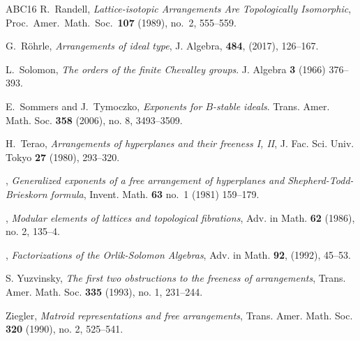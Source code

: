 \documentclass[12pt]{amsart}
\numberwithin{equation}{section}
\theoremstyle{plain}
\theoremstyle{definition}
\begin{document}
\begin{thebibliography}{ABC{\etalchar{+}}16}
R.~Randell,
\emph{Lattice-isotopic Arrangements Are Topologically Isomorphic},
Proc.\ Amer.\ Math.\ Soc.\ \textbf{107} (1989), no.~2, 555--559.

	G.~R\"ohrle,
	\emph{Arrangements of ideal type},
	J. Algebra, \textbf{484},  (2017), 126--167.

L.~Solomon, 
\emph{The orders of the finite Chevalley groups}.
J. Algebra \textbf{3} (1966) 376--393. 

E.~Sommers and J.~Tymoczko,
\emph{Exponents for $B$-stable ideals}.
Trans. Amer. Math. Soc. \textbf{358} (2006), no. 8, 3493--3509.

 H.~Terao, \emph{Arrangements of hyperplanes and
	their freeness I, II}, J. Fac. Sci.  Univ. Tokyo \textbf{27} (1980),
293--320.

\bysame,
\emph{Generalized exponents of a free arrangement of hyperplanes and
	Shepherd-Todd-Brieskorn formula}, Invent. Math. \textbf{63} no.\ 1 (1981) 159--179.

\bysame, 
\emph{Modular elements of lattices and topological fibrations},
Adv. in Math. \textbf{62} (1986), no. 2, 135--4.

\bysame,
\emph{Factorizations of the Orlik-Solomon Algebras},
Adv. in Math. \textbf{92}, (1992), 45--53.

S. Yuzvinsky,
\emph{The first two obstructions to the freeness of arrangements},
Trans. Amer. Math. Soc. \textbf{335} (1993), no. 1, 231--244.

Ziegler,
\emph{Matroid representations and free arrangements}, 
Trans. Amer. Math. Soc. \textbf{320} (1990), no. 2, 525--541.
\end{thebibliography}

\end{document}
